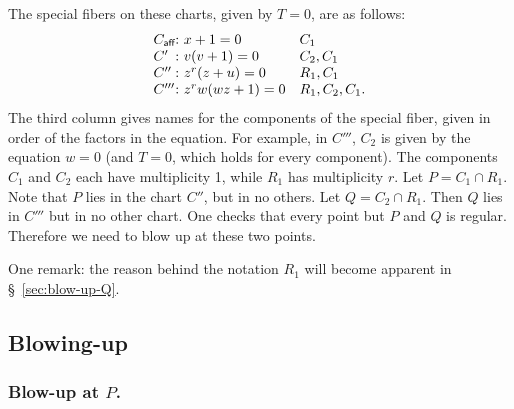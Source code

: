 \documentclass[pagesize,paper=letter]{scrartcl}
\newcommand{\caff}{C_{\textsf{aff}}}
\theoremstyle{plain}
\theoremstyle{definition}
\theoremstyle{remark}
\begin{document}
The special fibers on these charts, given by $T = 0$, are as follows:
\[
\begin{array}{l@{:\,\,}ll}
\caff & x + 1 = 0 & C_1 \\
C' & v(v + 1) = 0 & C_2, C_1 \\
C'' & z^r(z + u) = 0 & R_1, C_1 \\
C''' & z^rw(wz+1) = 0 & R_1, C_2, C_1.
\end{array}
\]
The third column gives names for the components of the special fiber, given in order of the factors in the equation. For example, in $C'''$, $C_2$ is given by the equation $w = 0$ (and $T = 0$, which holds for every component). The components $C_1$ and $C_2$ each have multiplicity 1, while $R_1$ has multiplicity $r$. Let $P = C_1 \cap R_1$. Note that $P$ lies in the chart $C''$, but in no others. Let $Q = C_2 \cap R_1$. Then $Q$ lies in $C'''$ but in no other chart. One checks that every point but $P$ and $Q$ is regular. Therefore we need to blow up at these two points.

One remark: the reason behind the notation $R_1$ will become apparent in \S~\ref{sec:blow-up-Q}.

\subsection{Blowing-up}
\label{sec:blowing-up}

\subsubsection{Blow-up at $P$.}
\label{sec:blow-up-P}
\end{document}
